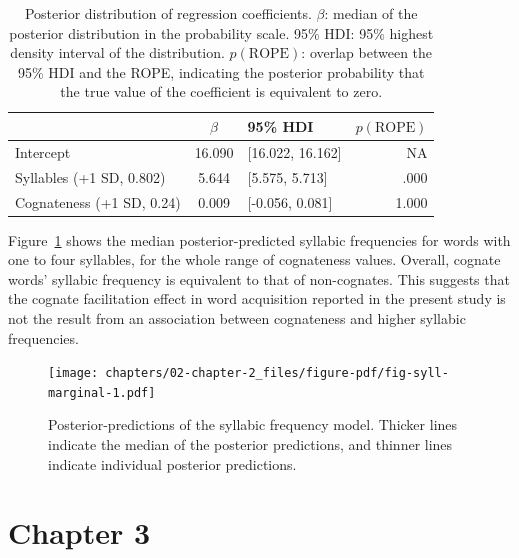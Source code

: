\documentclass[
  12pt,
  b5paperpaper,
  twoside]{scrreprt}
\newcommand{\blandscape}{\begin{landscape}}
\newcommand{\elandscape}{\end{landscape}}
\begin{document}
\hypertarget{tbl-syll-coefs}{}
\begin{table}
\caption{\label{tbl-syll-coefs}Posterior distribution of regression coefficients. \(\beta\): median of
the posterior distribution in the probability scale. 95\% HDI: 95\%
highest density interval of the distribution. \(p(\text{ROPE})\):
overlap between the 95\% HDI and the ROPE, indicating the posterior
probability that the true value of the coefficient is equivalent to
zero. }\tabularnewline

\centering
\begin{tabular}{lclr}
\toprule
 & $\beta$ & 95\% HDI & $p(\text{ROPE})$\\
\midrule
Intercept & 16.090 & {}[16.022, 16.162] & NA\\
Syllables (+1 SD, 0.802) & 5.644 & {}[5.575, 5.713] & .000\\
Cognateness (+1 SD, 0.24) & 0.009 & {}[-0.056, 0.081] & 1.000\\
\bottomrule
\end{tabular}
\end{table}

Figure~\ref{fig-syll-marginal} shows the median posterior-predicted
syllabic frequencies for words with one to four syllables, for the whole
range of cognateness values. Overall, cognate words' syllabic frequency
is equivalent to that of non-cognates. This suggests that the cognate
facilitation effect in word acquisition reported in the present study is
not the result from an association between cognateness and higher
syllabic frequencies.

\newpage

\blandscape

\begin{figure}

{\centering \texttt{[image: chapters/02-chapter-2\_files/figure-pdf/fig-syll-marginal-1.pdf]}

}

\caption{\label{fig-syll-marginal}Posterior-predictions of the syllabic
frequency model. Thicker lines indicate the median of the posterior
predictions, and thinner lines indicate individual posterior
predictions.}

\end{figure}

\elandscape

\newpage{}


\hypertarget{sec-chapter3}{%
\chapter{Chapter 3}\label{sec-chapter3}}
\end{document}
